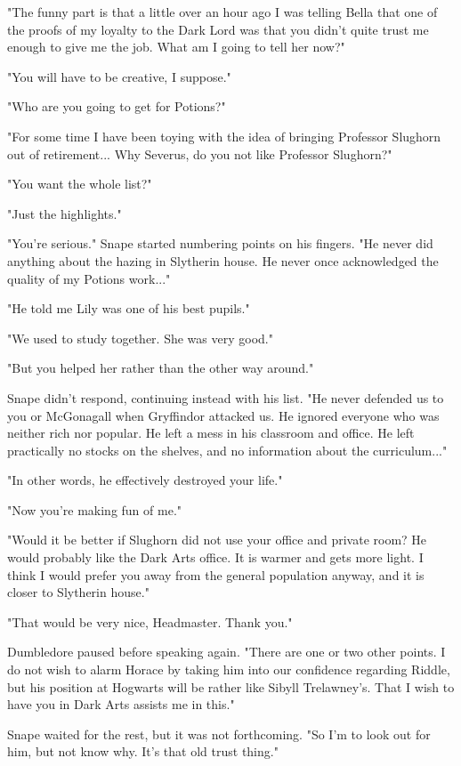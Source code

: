 \documentclass[a4paper,11pt]{article}
\begin{document}
"The funny part is that a little over an hour ago I was telling Bella that one of the proofs of my loyalty to the Dark Lord was that you didn't quite trust me enough to give me the job. What am I going to tell her now?"

"You will have to be creative, I suppose."

"Who are you going to get for Potions?"

"For some time I have been toying with the idea of bringing Professor Slughorn out of retirement... Why Severus, do you not like Professor Slughorn?"

"You want the whole list?"

"Just the highlights."

"You're serious." Snape started numbering points on his fingers. "He never did anything about the hazing in Slytherin house. He never once acknowledged the quality of my Potions work..."

"He told me Lily was one of his best pupils."

"We used to study together. She was very good."

"But you helped her rather than the other way around."

Snape didn't respond, continuing instead with his list. "He never defended us to you or McGonagall when Gryffindor attacked us. He ignored everyone who was neither rich nor popular. He left a mess in his classroom and office. He left practically no stocks on the shelves, and no information about the curriculum..."

"In other words, he effectively destroyed your life."

"Now you're making fun of me."

"Would it be better if Slughorn did not use your office and private room? He would probably like the Dark Arts office. It is warmer and gets more light. I think I would prefer you away from the general population anyway, and it is closer to Slytherin house."

"That would be very nice, Headmaster. Thank you."

Dumbledore paused before speaking again. "There are one or two other points. I do not wish to alarm Horace by taking him into our confidence regarding Riddle, but his position at Hogwarts will be rather like Sibyll Trelawney's. That I wish to have you in Dark Arts assists me in this."

Snape waited for the rest, but it was not forthcoming. "So I'm to look out for him, but not know why. It's that old trust thing."
\end{document}
